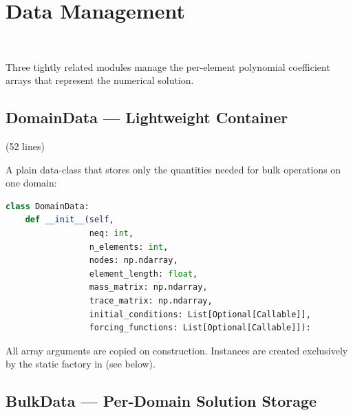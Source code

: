 \section{Data Management}
\label{sec:data_management}

\begin{center}
 ~~\textbar~~
 ~~\textbar~~
\end{center}

Three tightly related modules manage the per-element polynomial
coefficient arrays that represent the numerical solution.

\subsection{DomainData --- Lightweight Container}

\begin{center}
 \quad(52 lines)
\end{center}

A plain data-class that stores only the quantities needed for bulk operations on one domain:

\begin{lstlisting}[language=Python, caption={DomainData constructor}]
class DomainData:
    def __init__(self,
                 neq: int,
                 n_elements: int,
                 nodes: np.ndarray,
                 element_length: float,
                 mass_matrix: np.ndarray,
                 trace_matrix: np.ndarray,
                 initial_conditions: List[Optional[Callable]],
                 forcing_functions: List[Optional[Callable]]):
\end{lstlisting}

All array arguments are copied on construction.  Instances are created exclusively by the static factory in  (see below).

\subsection{BulkData --- Per-Domain Solution Storage}
\label{sec:bulk_data}

